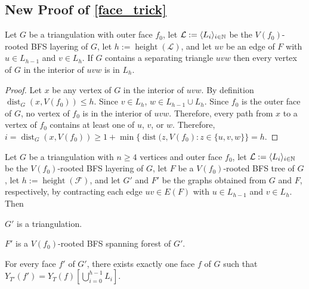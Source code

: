 \documentclass{patmorin}
\DeclareMathOperator{\height}{height}
\DeclareMathOperator{\dist}{dist}
\begin{document}
\subsection{New Proof of \cref{face_trick}}

\begin{obs}\label{separating_triangle_depth}
  Let $G$ be a triangulation with outer face $f_0$, let $\mathcal{L}:=\langle L_i\rangle_{i\in\mathbb{N}}$ be the $V(f_0)$-rooted BFS layering of $G$, let $h:=\height(\mathcal{L})$, and let $uv$ be an edge of $F$ with $u\in L_{h-1}$ and $v\in L_h$.  If $G$ contains a separating triangle $uvw$ then every vertex of $G$ in the interior of $uvw$ is in $L_h$.
\end{obs}

\begin{proof}
  Let $x$ be any vertex of $G$ in the interior of $uvw$. By definition $\dist_G(x,V(f_0))\le h$.  Since $v\in L_h$, $w\in L_{h-1}\cup L_h$.  Since $f_0$ is the outer face of $G$, no vertex of $f_0$ is in the interior of $uvw$.  Therefore, every path from $x$ to a vertex of $f_0$ contains at least one of $u$, $v$, or $w$.  Therefore, $i=\dist_G(x,V(f_0))\ge 1+\min\{\dist(z,V(f_0):z\in\{u,v,w\}\}=h$.
\end{proof}


\begin{lem}\label{retriangulate}
  Let $G$ be a triangulation with $n\ge 4$ vertices and outer face $f_0$, let $\mathcal{L}:=\langle L_i\rangle_{i\in\mathbb{N}}$ be the $V(f_0)$-rooted BFS layering of $G$, let $F$ be a $V(f_0)$-rooted BFS tree of $G$, let $h:=\height(\mathcal{F})$, and let $G'$ and $F'$ be the graphs obtained from $G$ and $F$, respectively, by contracting each edge $uv\in E(F)$ with $u\in L_{h-1}$ and $v\in L_h$.  Then
  \begin{compactenum}[(1)]
    \item $G'$ is a triangulation.
    \item $F'$ is a $V(f_0)$-rooted BFS spanning forest of $G'$.
    \item For every face $f'$ of $G'$, there exists exactly one face $f$ of $G$ such that  $Y_{T'}(f')=Y_{T}(f)[\bigcup_{i=0}^{h-1} L_i]$.
  \end{compactenum}
\end{lem}
\end{document}
